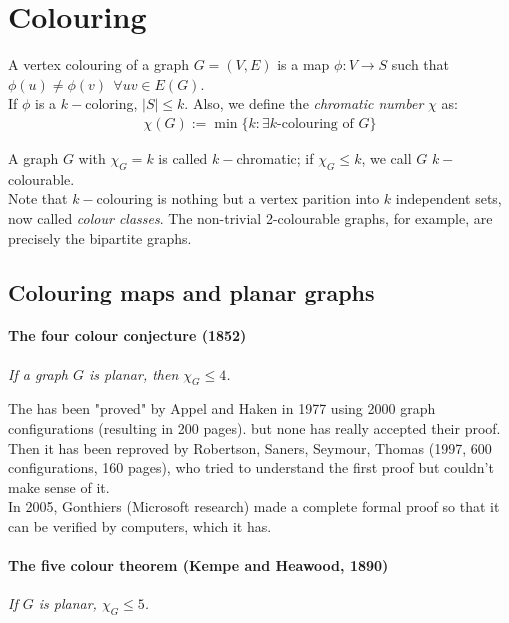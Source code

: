 
\chapter{Colouring}
A vertex colouring of a graph $G = (V,E)$ is a map $\phi: V \rightarrow S$ such that $\phi(u) \neq \phi(v) ~~\forall uv \in E(G)$.\\

If $\phi$ is a $k-$coloring, $|S| \leq k$. Also, we define the \textit{chromatic number} $\chi$ as:
\begin{eqnarray}
	\chi (G) := \min \{ k : \exists k\text{-colouring of }G \}
\end{eqnarray}

A graph $G$ with $\chi_{G} = k$ is called $k-$chromatic; if $\chi_{G} \leq k$, we call $G$ $k-$colourable.\\

Note that $k-$colouring is nothing but a vertex parition into $k$ independent sets, now called \textit{colour classes}. The non-trivial 2-colourable graphs, for example, are precisely the bipartite graphs.

	\section{Colouring maps and planar graphs}
		\subsubsection{The four colour conjecture (1852)}
		\textit{If a graph $G$ is planar, then $\chi_{G} \leq 4$.	\\}
		
		The has been "proved" by Appel and Haken in 1977 using 2000 graph configurations (resulting in 200 pages). but none has really accepted their proof. \\
		
		Then it has been reproved by Robertson, Saners, Seymour, Thomas (1997, 600 configurations, 160 pages), who tried to understand the first proof but couldn't make sense of it. \\
		
		In 2005, Gonthiers (Microsoft research) made a complete formal proof so that it can be verified by computers, which it has.
		
		\subsubsection{The five colour theorem (Kempe and Heawood, 1890)}
		\textit{If $G$ is planar, $\chi_{G} \leq 5$.\\}
		
